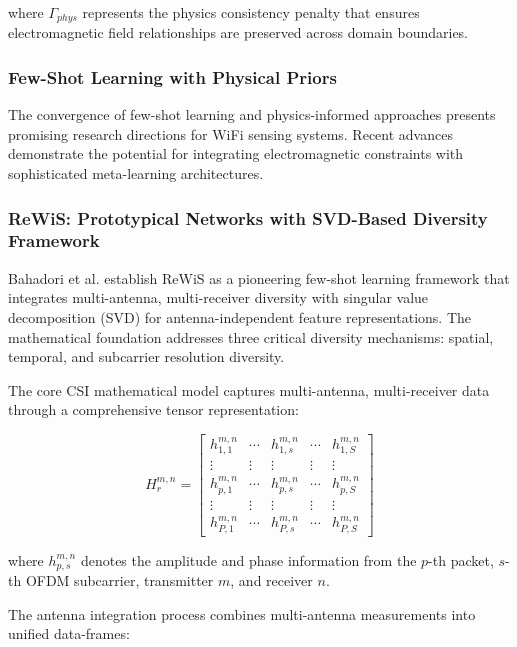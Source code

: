 \documentclass[journal]{IEEEtran}
\begin{document}
where $\Gamma_{phys}$ represents the physics consistency penalty that ensures electromagnetic field relationships are preserved across domain boundaries.

\subsubsection{Few-Shot Learning with Physical Priors}

The convergence of few-shot learning and physics-informed approaches presents promising research directions for WiFi sensing systems. Recent advances demonstrate the potential for integrating electromagnetic constraints with sophisticated meta-learning architectures.

\subsubsection{ReWiS: Prototypical Networks with SVD-Based Diversity Framework}

Bahadori et al. \cite{bahadori2022rewis} establish ReWiS as a pioneering few-shot learning framework that integrates multi-antenna, multi-receiver diversity with singular value decomposition (SVD) for antenna-independent feature representations. The mathematical foundation addresses three critical diversity mechanisms: spatial, temporal, and subcarrier resolution diversity.

The core CSI mathematical model captures multi-antenna, multi-receiver data through a comprehensive tensor representation:

\begin{equation}
H^{m,n}_r = \begin{bmatrix}
h^{m,n}_{1,1} & \cdots & h^{m,n}_{1,s} & \cdots & h^{m,n}_{1,S} \\
\vdots & \vdots & \vdots & \vdots & \vdots \\
h^{m,n}_{p,1} & \cdots & h^{m,n}_{p,s} & \cdots & h^{m,n}_{p,S} \\
\vdots & \vdots & \vdots & \vdots & \vdots \\
h^{m,n}_{P,1} & \cdots & h^{m,n}_{P,s} & \cdots & h^{m,n}_{P,S}
\end{bmatrix}
\label{eq:rewis_csi_matrix}
\end{equation}

where $h^{m,n}_{p,s}$ denotes the amplitude and phase information from the $p$-th packet, $s$-th OFDM subcarrier, transmitter $m$, and receiver $n$.

The antenna integration process combines multi-antenna measurements into unified data-frames:
\end{document}
